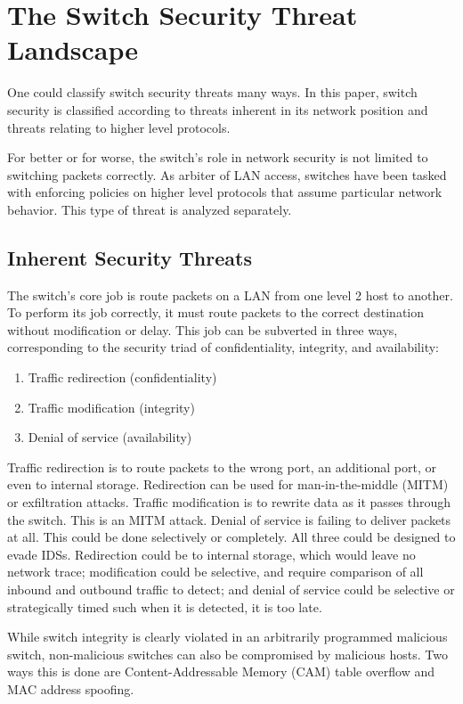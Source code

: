 \documentclass[journal]{IEEEtran}
\begin{document}
\section{The Switch Security Threat Landscape}
One could classify switch security threats many ways. In this paper, switch security is classified
according to threats inherent in its network position and threats relating to higher level
protocols.

For better or for worse, the switch's role in network security is not limited to switching packets
correctly. As arbiter of LAN access, switches have been tasked with enforcing policies on higher
level protocols that assume particular network behavior. This type of threat is analyzed separately.

\subsection{Inherent Security Threats}
The switch's core job is route packets on a LAN from one level 2 host to another. To perform its
job correctly, it must route packets to the correct destination without modification or delay. This
job can be subverted in three ways, corresponding to the security triad of confidentiality,
integrity, and availability:

\begin{enumerate}
  \item Traffic redirection (confidentiality) %
  \item Traffic modification (integrity)
  \item Denial of service (availability)
\end{enumerate}

Traffic redirection is to route packets to the wrong port, an additional port, or even to internal
storage. Redirection can be used for man-in-the-middle (MITM) or exfiltration attacks. Traffic
modification is to rewrite data as it passes through the switch. This is an MITM attack. Denial of
service is failing to deliver packets at all. This could be done selectively or completely. All
three could be designed to evade IDSs. Redirection could be to internal storage, which would leave
no network trace; modification could be selective, and require comparison of all inbound and
outbound traffic to detect; and denial of service could be selective or strategically timed such
when it is detected, it is too late.

While switch integrity is clearly violated in an arbitrarily programmed malicious switch,
non-malicious switches can also be compromised by malicious hosts. Two ways this is done are
Content-Addressable Memory (CAM) table overflow and MAC address spoofing.
\end{document}
